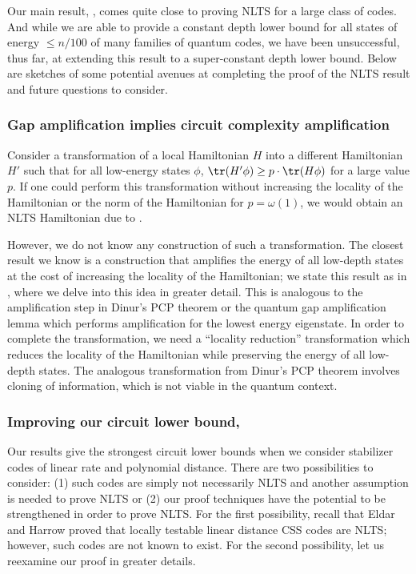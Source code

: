 \documentclass{toc}
\begin{document}
Our main result, , comes quite close to proving NLTS for a large class of codes. And while we are able to provide a constant depth lower bound for all states of energy $\leq n/100$ of many families of quantum codes, we have been unsuccessful, thus far, at extending this result to a super-constant depth lower bound. Below are sketches of some potential avenues at completing the proof of the NLTS result and future questions to consider.

\subsubsection{Gap amplification implies circuit complexity amplification}

\label{sec:openamplify}

Consider a transformation of a local Hamiltonian $H$ into a different Hamiltonian $H'$ such that for all low-energy states $\phi$, $\tr(H' \phi) \geq p \cdot \tr(H \phi)$ for a large value $p$. If one could perform this transformation without increasing the locality of the Hamiltonian or the norm of the Hamiltonian for $p = \omega(1)$, we would obtain an NLTS Hamiltonian due to .  

However, we do not know any construction of such a transformation. The closest result we know is a construction that amplifies the energy of all low-depth states %
%
at the cost of increasing the locality of the Hamiltonian;  we state this result as  in , where we delve into this idea in greater detail. This is analogous to the amplification step in Dinur's PCP theorem \cite{dinur-pcp} or the quantum gap amplification lemma \cite{10.1145/1536414.1536472} which performs amplification for the lowest energy eigenstate. In order to complete the transformation, we need a ``locality reduction'' transformation which reduces the locality of the Hamiltonian while preserving the energy of all low-depth states. The analogous transformation from Dinur's PCP theorem involves cloning of information, which is not viable in the quantum context.

\subsubsection{Improving our circuit lower bound, }

Our results give the strongest circuit lower bounds when we consider stabilizer codes of linear rate and polynomial distance. There are two possibilities to consider: (1) such codes are simply not necessarily NLTS and another assumption is needed to prove NLTS or (2) our proof techniques have the potential to be strengthened in order to prove NLTS. For the first possibility, recall that Eldar and Harrow \cite{8104078} proved that
locally testable %
linear distance CSS codes are NLTS; however, such codes are not known to exist. For the second possibility, let us reexamine our proof in greater details. 
\end{document}
